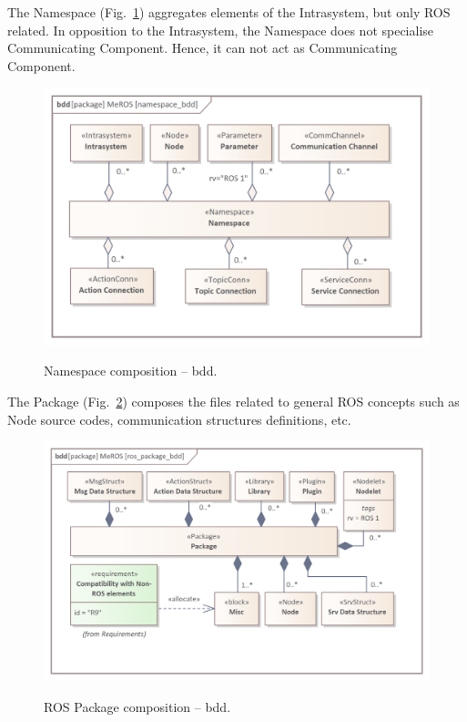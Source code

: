\documentclass[11pt,oneside,a4paper]{article}
\begin{document}
	
	The Namespace (Fig.~\ref{fig:namespace_bdd}) aggregates elements of the Intrasystem, but only ROS related. In opposition to the Intrasystem, the Namespace does not specialise Communicating Component. Hence, it can not act as Communicating Component.
	
	
	\begin{figure}[H]
		\centering
		\begin{center}
			{\includegraphics[scale=1.0]{img/meros_pkg/namespace_bdd.png}}
		\end{center}
		\caption{Namespace composition -- bdd.} 
		\label{fig:namespace_bdd}
	\end{figure}
	
	\pagebreak
	
	
	The Package (Fig.~\ref{fig:ros_package_bdd}) composes the files related to general ROS concepts such as Node source codes, communication structures definitions, etc. 
	
	
	\begin{figure}[H]
		\centering
		\begin{center}
			{\includegraphics[scale=1.0]{img/meros_pkg/ros_package_bdd.png}}
		\end{center}
		\caption{ROS Package composition -- bdd.} 
		\label{fig:ros_package_bdd}
	\end{figure}
		
\end{document}
